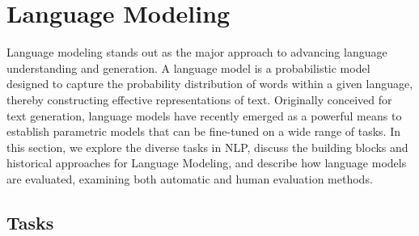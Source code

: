 



\section{Language Modeling}

Language modeling stands out as the major approach to advancing language understanding and generation. A language model is a probabilistic model designed to capture the probability distribution of words within a given language, thereby constructing effective representations of text. Originally conceived for text generation, language models have recently emerged as a powerful means to establish parametric models that can be fine-tuned on a wide range of tasks. 
In this section, we explore the diverse tasks in \ac{NLP}, discuss the building blocks and historical approaches for Language Modeling, and describe how language models are evaluated, examining both automatic and human evaluation methods.

\subsection{Tasks} 

